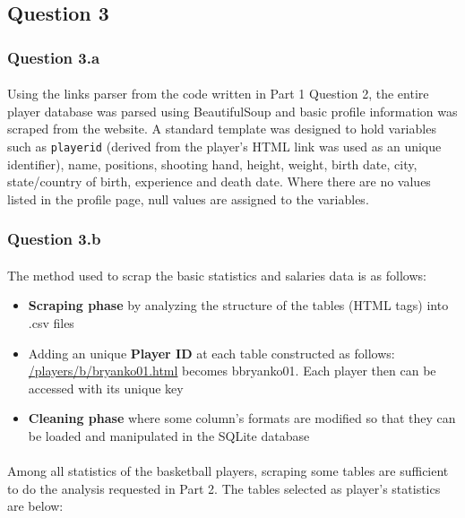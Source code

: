 
\subsection{Question 3}
\label{subsec:313}

\subsubsection{Question 3.a}
\label{subsubsec:313a}
\paragraph{}Using the links parser from the code written in Part 1 Question 2, the entire player database was parsed using BeautifulSoup and basic profile information was scraped from the website. A standard template was designed to hold variables such as \verb|playerid| (derived from the player’s HTML link was used as an unique identifier), name, positions, shooting hand, height, weight, birth date, city, state/country of birth, experience and death date. Where there are no values listed in the profile page, null values are assigned to the variables.

\subsubsection{Question 3.b}
\label{subsubsec:313b}

\paragraph{}The method used to scrap the basic statistics and salaries data is as follows:

\begin{itemize}
	\item \textbf{Scraping phase} by analyzing the structure of the tables (HTML tags) into .csv files
	\item Adding an unique \textbf{Player ID} at each table constructed as follows: \url{/players/b/bryanko01.html} becomes bbryanko01. Each player then can be accessed with its unique key
	\item \textbf{Cleaning phase} where some column's formats are modified so that they can be loaded and manipulated in the SQLite database
\end{itemize}

\paragraph{}Among all statistics of the basketball players, scraping some tables are sufficient to do the analysis requested in Part 2. The tables selected as player's statistics are below:

